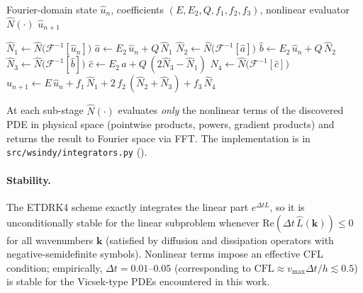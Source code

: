 \begin{breakablealgorithm}
\caption{ETDRK4 time-stepping (one step, Fourier domain)}
\label{alg:etdrk4}
{\footnotesize
\begin{algorithmic}[1]
\Require Fourier-domain state $\hat u_n$, coefficients $(E,E_2,Q,f_1,f_2,f_3)$, nonlinear evaluator $\hat N(\cdot)$
\Ensure $\hat u_{n+1}$

\State $\hat N_1 \gets \hat N\bigl(\mathcal{F}^{-1}[\hat u_n]\bigr)$
\State $\hat a \gets E_2\,\hat u_n + Q\,\hat N_1$
\State $\hat N_2 \gets \hat N\bigl(\mathcal{F}^{-1}[\hat a]\bigr)$
\State $\hat b \gets E_2\,\hat u_n + Q\,\hat N_2$
\State $\hat N_3 \gets \hat N\bigl(\mathcal{F}^{-1}[\hat b]\bigr)$
\State $\hat c \gets E_2\,\hat a + Q\,(2\hat N_3 - \hat N_1)$
\State $\hat N_4 \gets \hat N\bigl(\mathcal{F}^{-1}[\hat c]\bigr)$
\State $\hat u_{n+1} \gets E\,\hat u_n + f_1\,\hat N_1 + 2\,f_2\,(\hat N_2 + \hat N_3) + f_3\,\hat N_4$
\end{algorithmic}
}
\end{breakablealgorithm}

\noindent At each sub-stage $\hat N(\cdot)$ evaluates \emph{only} the nonlinear
terms of the discovered PDE in physical space (pointwise products, powers,
gradient products) and returns the result to Fourier space via FFT.
The implementation is in \texttt{src/wsindy/integrators.py}
().

\paragraph{Stability.}
The ETDRK4 scheme exactly integrates the linear part $e^{\Delta t L}$, so
it is unconditionally stable for the linear subproblem whenever
$\mathrm{Re}(\Delta t\,\hat{L}(\mathbf{k}))\le 0$ for all wavenumbers
$\mathbf{k}$ (satisfied by diffusion and dissipation operators with
negative-semidefinite symbols).  Nonlinear terms impose an effective
CFL condition; empirically, $\Delta t = 0.01$--$0.05$ (corresponding to
$\mathrm{CFL}\approx v_{\max}\Delta t/h\lesssim 0.5$) is stable for the
Vicsek-type PDEs encountered in this work.
